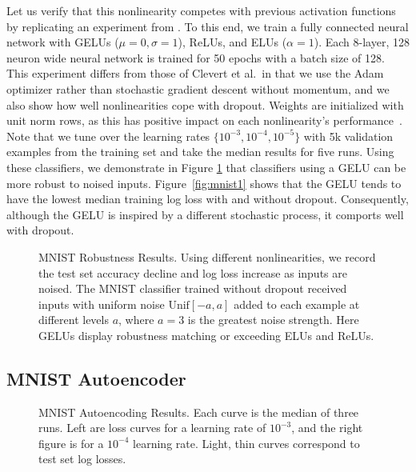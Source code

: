 \documentclass{article}
\begin{document}
Let us verify that this nonlinearity competes with previous activation functions by replicating an experiment from \citet{elu}. To this end, we train a fully connected neural network with GELUs ($\mu = 0, \sigma = 1$), ReLUs, and ELUs ($\alpha = 1$). Each 8-layer, 128 neuron wide neural network is trained for 50 epochs with a batch size of 128. This experiment differs from those of Clevert et al.~in that we use the Adam optimizer \citep{adam} rather than stochastic gradient descent without momentum, and we also show how well nonlinearities cope with dropout. Weights are initialized with unit norm rows, as this has positive impact on each nonlinearity's performance~\citep{hendrycks, weights, init2}. Note that we tune over the learning rates $\{10^{-3},10^{-4},10^{-5}\}$ with 5k validation examples from the training set and take the median results for five runs. Using these classifiers, we demonstrate in Figure \ref{fig:robustness} that classifiers using a GELU can be more robust to noised inputs. Figure~\ref{fig:mnist1} shows that the GELU tends to have the lowest median training log loss with and without dropout. Consequently, although the GELU is inspired by a different stochastic process, it comports well with dropout.

\begin{figure}
	\centering
	\noindent{}
	\caption{MNIST Robustness Results. Using different nonlinearities, we record the test set accuracy decline and log loss increase as inputs are noised. The MNIST classifier trained without dropout received inputs with uniform noise $\text{Unif}[-a,a]$ added to each example at different levels $a$, where $a=3$ is the greatest noise strength. Here GELUs display robustness matching or exceeding ELUs and ReLUs.}\label{fig:robustness}
\end{figure}

\subsection{MNIST Autoencoder}
\begin{figure}
	\centering
	\noindent{}
	\caption{MNIST Autoencoding Results. Each curve is the median of three runs. Left are loss curves for a learning rate of $10^{-3}$, and the 
right figure is for a $10^{-4}$ %
learning rate. Light, thin curves correspond to test set log losses.}\label{fig:mnist2}
\end{figure}
\end{document}
